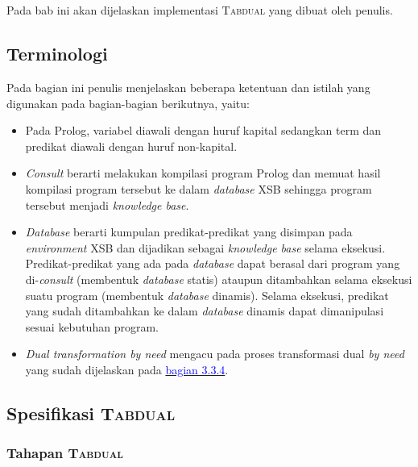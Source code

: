 \chapter{\babEmpat}
Pada bab ini akan dijelaskan implementasi \textsc{Tabdual} yang dibuat oleh penulis.

\section{Terminologi}

Pada bagian ini penulis menjelaskan beberapa ketentuan dan istilah yang digunakan pada bagian-bagian berikutnya, yaitu:

\begin{itemize}
	\item Pada Prolog, variabel diawali dengan huruf kapital sedangkan term dan predikat diawali dengan huruf non-kapital.
	\item \textit{Consult} berarti melakukan kompilasi program Prolog dan memuat hasil kompilasi program tersebut ke dalam \textit{database} XSB sehingga program tersebut menjadi \textit{knowledge base}.
	\item \textit{Database} berarti kumpulan predikat-predikat yang disimpan pada \textit{environment} XSB dan dijadikan sebagai \textit{knowledge base} selama eksekusi. Predikat-predikat yang ada pada \textit{database} dapat berasal dari program yang di-\textit{consult} (membentuk \textit{database} statis) ataupun ditambahkan selama eksekusi suatu program (membentuk \textit{database} dinamis). Selama eksekusi, predikat yang sudah ditambahkan ke dalam \textit{database} dinamis dapat dimanipulasi sesuai kebutuhan program.
	\item \textit{Dual transformation by need} mengacu pada proses transformasi dual \textit{by need} yang sudah dijelaskan pada \hyperref[dualbyneed]{\textcolor{blue}{bagian 3.3.4}}.
\end{itemize}

\section{Spesifikasi \textsc{Tabdual}}

\subsection{Tahapan \textsc{Tabdual}}

